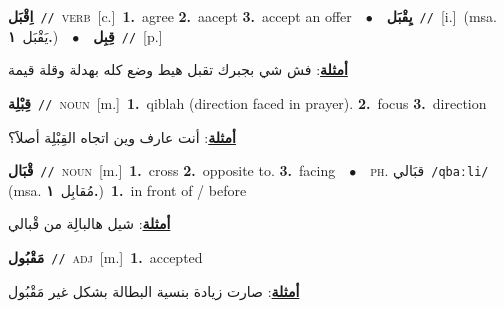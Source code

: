 \documentclass[10pt,a4paper,twoside]{article} %
\begin{document}
\begin{multicols}{2}
{{{{{{{{{{{{\setlength\topsep{0pt}\textbf{\foreignlanguage{arabic}{اِقْبَل}}\ {\color{gray}\texttt{//}\color{black}}\ \textsc{verb}\ [c.]\ \textbf{1.}~agree  \textbf{2.}~aacept  \textbf{3.}~accept an offer\ \ $\bullet$\ \ \setlength\topsep{0pt}\textbf{\foreignlanguage{arabic}{يِقْبَل}}\ {\color{gray}\texttt{//}\color{black}}\ [i.]\ \color{gray}(msa. \foreignlanguage{arabic}{يَقْبَل}~\foreignlanguage{arabic}{\textbf{١.}})\color{black}\ \ $\bullet$\ \ \setlength\topsep{0pt}\textbf{\foreignlanguage{arabic}{قِبِل}}\ {\color{gray}\texttt{//}\color{black}}\ [p.]\  \begin{flushright}\color{gray}\foreignlanguage{arabic}{\textbf{\underline{\foreignlanguage{arabic}{أمثلة}}}: فش شي بجبرك تقبل هيط وضع كله بهدلة وقلة قيمة}\end{flushright}\color{black}} \vspace{2mm}

{\setlength\topsep{0pt}\textbf{\foreignlanguage{arabic}{قِبْلِة}}\ {\color{gray}\texttt{//}\color{black}}\ \textsc{noun}\ [m.]\ \textbf{1.}~qiblah (direction faced in prayer).  \textbf{2.}~focus  \textbf{3.}~direction\  \begin{flushright}\color{gray}\foreignlanguage{arabic}{\textbf{\underline{\foreignlanguage{arabic}{أمثلة}}}: أنت عارف وين اتجاه القِبْلِة أصلاََ؟}\end{flushright}\color{black}} \vspace{2mm}

{\setlength\topsep{0pt}\textbf{\foreignlanguage{arabic}{قْبَال}}\ {\color{gray}\texttt{//}\color{black}}\ \textsc{noun}\ [m.]\ \textbf{1.}~cross  \textbf{2.}~opposite to.  \textbf{3.}~facing\ \ $\bullet$\ \ \textsc{ph.} \color{gray} \foreignlanguage{arabic}{قبَالي}\color{black}\ {\color{gray}\texttt{/{\sffamily qbaːli}/}\color{black}}\ \color{gray} (msa. \foreignlanguage{arabic}{مُقابِل}~\foreignlanguage{arabic}{\textbf{١.}})\color{black}\ \textbf{1.}~in front of / before\  \begin{flushright}\color{gray}\foreignlanguage{arabic}{\textbf{\underline{\foreignlanguage{arabic}{أمثلة}}}: شيل هالبالِة من قْبالي}\end{flushright}\color{black}} \vspace{2mm}

{\setlength\topsep{0pt}\textbf{\foreignlanguage{arabic}{مَقْبُول}}\ {\color{gray}\texttt{//}\color{black}}\ \textsc{adj}\ [m.]\ \textbf{1.}~accepted\  \begin{flushright}\color{gray}\foreignlanguage{arabic}{\textbf{\underline{\foreignlanguage{arabic}{أمثلة}}}: صارت زيادة بنسية البطالة بشكل غير مَقْبُول}\end{flushright}\color{black}} \vspace{2mm}

}}}}}}}}}}}
\end{multicols}
\end{document}
